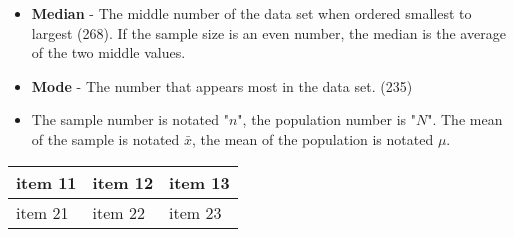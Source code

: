\documentclass[a4paper]{article}
\let\bf\textbf
\begin{document}
\begin{itemize}
    \item \bf{Median} - The middle number of the data set when ordered smallest to largest (268). If the sample size is an even number, the median is the average of the two middle values.

    \item \bf{Mode} - The number that appears most in the data set. (235)

    \item The sample number is notated "$n$", the population number is "$N$". The mean of the sample is notated $\bar{x}$, the mean of the population is notated $\mu$.
\end{itemize}

\begin{tabularx}{0.8\textwidth}{ 
    | >{\raggedright\arraybackslash}X 
    | >{\centering\arraybackslash}X 
    | >{\raggedleft\arraybackslash}X |}
    \hline
    item 11 & item 12 & item 13 \\
    \hline
    item 21  & item 22  & item 23  \\
    \hline
\end{tabularx}
\end{document}
